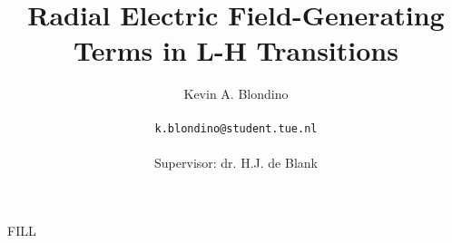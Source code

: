 \documentclass[a4paper,12pt]{report}
\title{Radial Electric Field-Generating Terms in L-H Transitions}
\author{{\Large Kevin A. Blondino} \\\\
	\texttt{k.blondino@student.tue.nl} \\\\
	Supervisor: dr. H.J. de Blank}
\begin{document}
\maketitle

FILL
\end{document}
